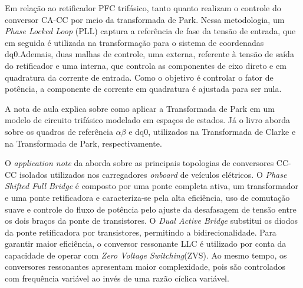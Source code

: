 
Em relação ao retificador PFC trifásico, tanto \cite{3phPlecs} quanto \cite{WANG2013/03}
realizam o controle do conversor CA-CC por meio da transformada de Park. Nessa metodologia, um
\textit{Phase Locked Loop} (PLL) captura a referência de fase da tensão de entrada, que em
seguida é utilizada na transformação para o sistema de coordenadas dq0.Ademais, duas malhas de
controle, uma externa, referente à tensão de saída do retificador e uma interna, que controla
as componentes de eixo direto e em quadratura da corrente de entrada. Como o objetivo é
controlar o fator de potência, a componente de corrente em quadratura é ajustada para ser nula.

A nota de aula \cite{dq0_transform} explica sobre como aplicar a Transformada de Park em um
modelo de circuito trifásico modelado em espaços de estados. Já o livro \cite{} aborda sobre os
quadros de referência \(\alpha \beta\) e dq0, utilizados na Transformada de Clarke e na
Transformada de Park, respectivamente.


O \textit{application note} da \cite{Infineon_CoolMOS_CFD7A} aborda sobre as principais
topologias de conversores CC-CC isolados utilizados nos carregadores \textit{onboard} de
veículos elétricos. O \textit{Phase Shifted Full Bridge} é composto por uma ponte completa
ativa, um transformador e uma ponte retificadora e caracteriza-se pela alta eficiência, uso de
comutação suave e controle do fluxo de potência pelo ajuste da desafasagem de tensão entre os
dois braços da ponte de transistores. O \textit{Dual Active Bridge} substitui os diodos da
ponte retificadora por transistores, permitindo a bidirecionalidade. Para garantir maior
eficiência, o conversor ressonante LLC é utilizado por conta da capacidade de operar com
\textit{Zero Voltage Switching}(ZVS). Ao mesmo tempo, os conversores ressonantes apresentam
maior complexidade, pois são controlados com frequência variável ao invés de uma razão cíclica
variável.

